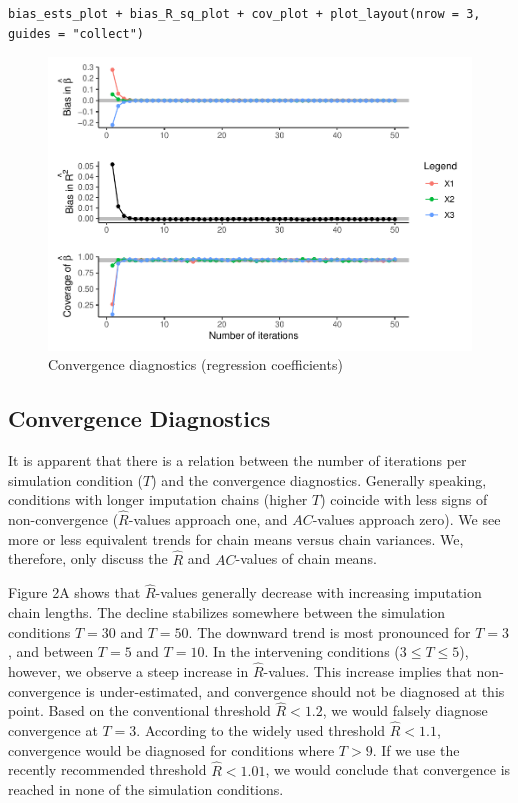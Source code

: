 \documentclass[Royal,times,sageh]{sagej}
\begin{document}
\begin{verbatim}
bias_ests_plot + bias_R_sq_plot + cov_plot + plot_layout(nrow = 3, guides = "collect")
\end{verbatim}

\begin{figure}
\centering
\includegraphics{manuscript_files/figure-latex/unnamed-chunk-4-1.pdf}
\caption{Convergence diagnostics (regression coefficients)}
\end{figure}

\hypertarget{convergence-diagnostics-1}{%
\subsection{Convergence Diagnostics}\label{convergence-diagnostics-1}}

It is apparent that there is a relation between the number of iterations
per simulation condition (\(T\)) and the convergence diagnostics.
Generally speaking, conditions with longer imputation chains (higher
\(T\)) coincide with less signs of non-convergence
(\(\widehat{R}\)-values approach one, and \(AC\)-values approach zero).
We see more or less equivalent trends for chain means versus chain
variances. We, therefore, only discuss the \(\widehat{R}\) and
\(AC\)-values of chain means.

Figure 2A shows that \(\widehat{R}\)-values generally decrease with
increasing imputation chain lengths. The decline stabilizes somewhere
between the simulation conditions \(T=30\) and \(T=50\). The downward
trend is most pronounced for \(T=3\), and between \(T = 5\) and
\(T = 10\). In the intervening conditions (\(3 \leq T \leq 5\)),
however, we observe a steep increase in \(\widehat{R}\)-values. This
increase implies that non-convergence is under-estimated, and
convergence should not be diagnosed at this point. Based on the
conventional threshold \(\widehat{R} < 1.2\), we would falsely diagnose
convergence at \(T=3\). According to the widely used threshold
\(\widehat{R} < 1.1\), convergence would be diagnosed for conditions
where \(T>9\). If we use the recently recommended threshold
\(\widehat{R} < 1.01\), we would conclude that convergence is reached in
none of the simulation conditions.
\end{document}
